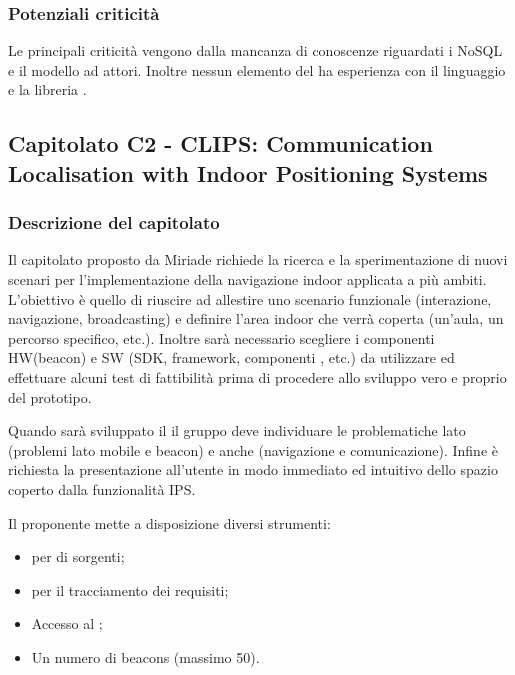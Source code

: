 \documentclass[a4paper, titlepage]{article}
\begin{document}
\subsubsection{Potenziali criticità}
Le principali criticità vengono dalla mancanza di conoscenze riguardati i  NoSQL e il modello ad attori. Inoltre nessun elemento del  ha esperienza con il linguaggio  e la libreria .

\newpage

\subsection{Capitolato C2 - CLIPS: Communication  Localisation with Indoor Positioning Systems}

\subsubsection{Descrizione del capitolato}

Il capitolato proposto da Miriade richiede la ricerca e la sperimentazione di nuovi scenari per l'implementazione della navigazione indoor applicata a più ambiti.
L'obiettivo è quello di riuscire ad allestire uno scenario funzionale (interazione, navigazione, broadcasting) e definire l'area indoor che verrà coperta (un'aula, un percorso specifico, etc.). Inoltre sarà necessario scegliere i componenti HW(beacon) e SW (SDK, framework, componenti , etc.) da utilizzare ed effettuare alcuni test di fattibilità prima di procedere allo sviluppo vero e proprio del prototipo.

Quando sarà sviluppato il  il gruppo deve individuare le problematiche lato  (problemi lato mobile e beacon) e anche  (navigazione e comunicazione). Infine è richiesta la presentazione all'utente in modo immediato ed intuitivo dello spazio coperto dalla funzionalità IPS.

Il proponente mette a disposizione diversi strumenti:
\begin{itemize}
	\item {} per  di sorgenti;
	\item {} per il tracciamento dei requisiti;
	\item Accesso al  ;
	\item Un numero di beacons (massimo 50).
	
\end{itemize}
\end{document}
